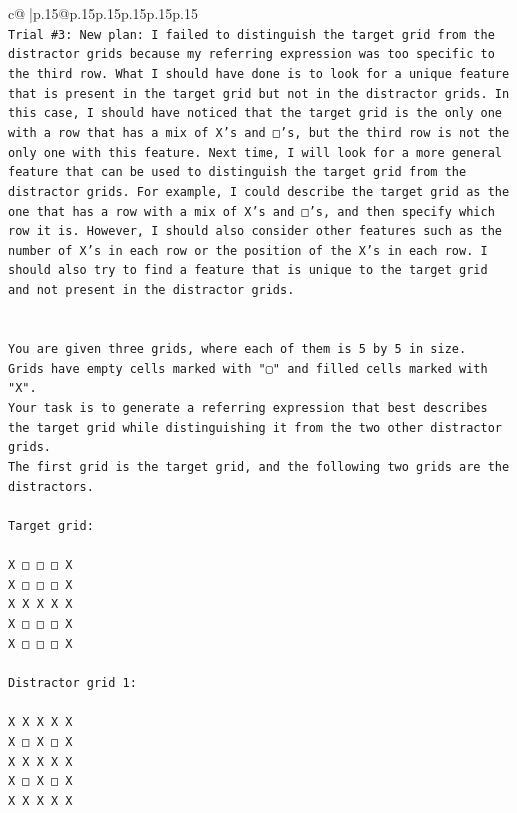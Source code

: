 \documentclass{article}
\begin{document}
{\begin{supertabular}{c@{$\;$}|p{.15\linewidth}@{}p{.15\linewidth}p{.15\linewidth}p{.15\linewidth}p{.15\linewidth}p{.15\linewidth}}
{{{\\ 
\texttt{Trial \#3: New plan: I failed to distinguish the target grid from the distractor grids because my referring expression was too specific to the third row. What I should have done is to look for a unique feature that is present in the target grid but not in the distractor grids. In this case, I should have noticed that the target grid is the only one with a row that has a mix of X's and □'s, but the third row is not the only one with this feature. Next time, I will look for a more general feature that can be used to distinguish the target grid from the distractor grids. For example, I could describe the target grid as the one that has a row with a mix of X's and □'s, and then specify which row it is. However, I should also consider other features such as the number of X's in each row or the position of the X's in each row. I should also try to find a feature that is unique to the target grid and not present in the distractor grids.} \\
\\ 
\\ 
\texttt{You are given three grids, where each of them is 5 by 5 in size.} \\
\texttt{Grids have empty cells marked with "▢" and filled cells marked with "X".} \\
\texttt{Your task is to generate a referring expression that best describes the target grid while distinguishing it from the two other distractor grids.} \\
\texttt{The first grid is the target grid, and the following two grids are the distractors.} \\
\\ 
\texttt{Target grid:} \\
\\ 
\texttt{X □ □ □ X} \\
\texttt{X □ □ □ X} \\
\texttt{X X X X X} \\
\texttt{X □ □ □ X} \\
\texttt{X □ □ □ X} \\
\\ 
\texttt{Distractor grid 1:} \\
\\ 
\texttt{X X X X X} \\
\texttt{X □ X □ X} \\
\texttt{X X X X X} \\
\texttt{X □ X □ X} \\
\texttt{X X X X X} \\
}}}
\end{supertabular}}
\end{document}
